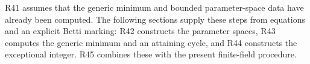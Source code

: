 R41 assumes that the generic minimum and bounded parameter-space data
have already been computed. The following sections supply these steps
from equations and an explicit Betti marking: R42 constructs the
parameter spaces, R43 computes the generic minimum and an attaining
cycle, and R44 constructs the exceptional integer. R45 combines these
with the present finite-field procedure.

